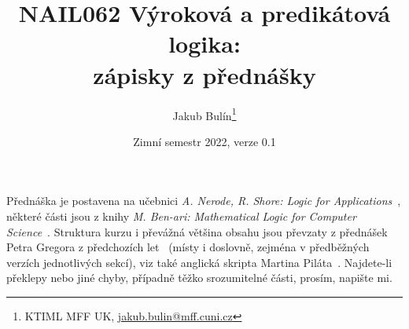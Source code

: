\title{NAIL062 Výroková a predikátová logika: \\ zápisky z přednášky}
\author{Jakub Bulín\footnote{KTIML MFF UK, \href{mailto://jakub.bulin@mff.cuni.cz}{jakub.bulin@mff.cuni.cz}}}
\date{Zimní semestr 2022, verze 0.1}
\maketitle

Přednáška je postavena na učebnici \emph{A. Nerode, R. Shore: Logic for Applications}~\cite{nerode_logic_2012}, některé části jsou z knihy \emph{M. Ben-ari: Mathematical Logic for Computer Science}~\cite{ben-ari_mathematical_2012}. Struktura kurzu i převážná většina obsahu jsou převzaty z přednášek Petra Gregora z předchozích let~\cite{gregor_vyrokova_nodate} (místy i doslovně, zejména v předběžných verzích jednotlivých sekcí), viz také anglická skripta Martina Piláta~\cite{pilat_lecture_nodate}. Najdete-li překlepy nebo jiné chyby, případně těžko srozumitelné části, prosím, napište mi.


\tableofcontents